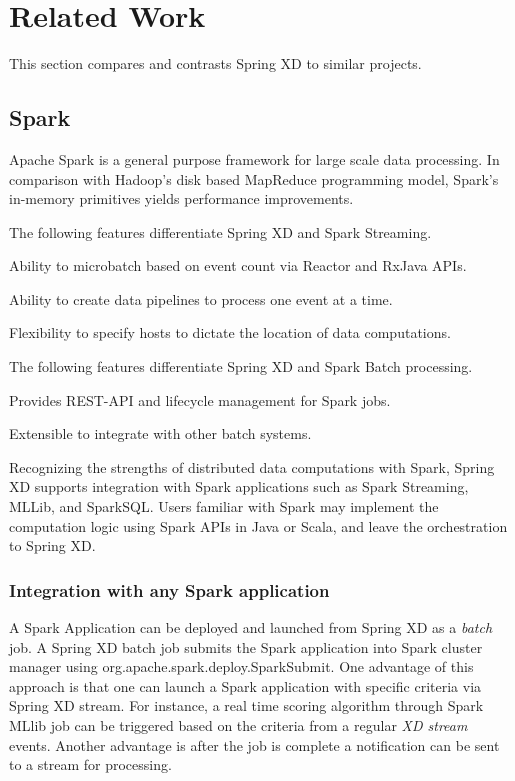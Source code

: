 \section{Related Work}
This section compares and contrasts Spring XD to similar projects.

\subsection{Spark}
\label{sec:Spark}
Apache Spark is a general purpose framework for large scale data processing.
In comparison with Hadoop's disk based MapReduce programming model, Spark's
in-memory primitives yields performance improvements.

The following features differentiate Spring XD and Spark Streaming.

\begin{itemize*}
\item Ability to microbatch based on event count via Reactor and RxJava APIs.
\item Ability to create data pipelines to process one event at a time.
\item Flexibility to specify hosts to dictate the location of data computations.
\end{itemize*}

The following features differentiate Spring XD and Spark Batch processing.

\begin{itemize*}
\item Provides REST-API and lifecycle management for Spark jobs.
\item Extensible to integrate with other batch systems.
\end{itemize*}

Recognizing the strengths of distributed data computations with Spark, Spring XD
supports integration with Spark applications such as Spark Streaming, MLLib, and
SparkSQL. Users familiar with Spark may implement the computation logic using
Spark APIs in Java or Scala, and leave the orchestration to Spring XD.

\subsubsection{Integration with any Spark application}
A Spark Application can be deployed and launched from Spring XD as
a \emph{batch} job. A Spring XD batch job submits the Spark application into
Spark cluster manager using org.apache.spark.deploy.SparkSubmit. One advantage 
of this approach is that one can launch a Spark application with specific criteria
via Spring XD stream. For instance, a real time scoring algorithm through Spark MLlib
job can be triggered based on the criteria from a regular \emph{XD stream} events. 
Another advantage is after the job is complete a notification can be sent to a 
stream for processing.

